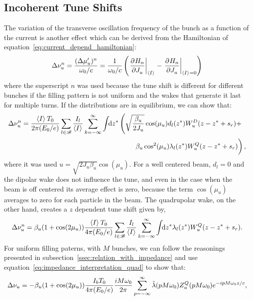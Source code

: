 \subsection{Incoherent Tune Shifts}\label{sec:incoherent_tune_shift}

    The variation of the transverse oscillation frequency of the bunch as a function of the current is another effect which can be derived from the Hamiltonian of equation~\eqref{eq:current_depend_hamiltonian}:
    \begin{align}
        \Delta\nu_u^n = \frac{(\Delta\mu'_u)^n}{\omega_0/c} = \frac{1}{\omega_0/c}\left(\left.\frac{\partial^{{}}H_n}{\partial J_u^{{}}}\right|_{\left\langle I \right\rangle_{{}}} - \left.\frac{\partial^{{}}H_n}{\partial J_u^{{}}}\right|_{\left\langle I \right\rangle_{{}}=0}\right)
    \end{align}
    where the superscript $n$ was used because the tune shift is different for different bunches if the filling pattern is not uniform and the wakes that generate it last for multiple turns. If the distributions are in equilibrium, we can show that:
    \begin{align}
        \Delta\nu_u^n = \frac{\average{I}T_0}{2\pi(E_0/e)}
        \sum_{l\in\mathscr{B}}\frac{I_l}{\average{I}}\sum_{k=-\infty}^\infty\udefint{z^*}{
        &\left(\sqrt{\frac{\beta_u}{2J_u}}\cos(\mu_u)d_l(z^*) W^D_u(z-z^* + s_r) +\right.\\
        &\left.\phantom{\sqrt{\frac{1_1}{1_1}}}\beta_u\cos^2(\mu_u)\lambda_l(z^*) W^Q_u(z-z^* + s_r)\right)},
    \end{align}
    where it was used $u = \sqrt{2J_u\beta_u}\cos(\mu_u)$. For a well centered beam, $d_l=0$ and the dipolar wake does not influence the tune, and even in the case when the beam is off centered its average effect is zero, because the term $\cos(\mu_u)$ averages to zero for each particle in the beam. The quadrupolar wake, on the other hand, creates a $z$ dependent tune shift given by,
    \begin{align}
        \Delta\nu_u^n = \beta_u(1+\cos(2\mu_u))\frac{\left\langle I \right\rangle_{{}}T_0}{4\pi(E_0/e)}
        \sum_{l\in\mathscr{B}}\frac{I_l}{\left\langle I \right\rangle_{{}}}\sum_{k=-\infty}^\infty\int\!\!\text{d}z^* 
        \lambda_l(z^*) W^Q_u(z-z^* + s_r).
    \end{align}
    For uniform filling paterns, with $M$ bunches, we can follow the reasonings presented in subsection~\ref{ssec:relation_with_impedance} and use equation~\eqref{eq:impedance_interpretation_quad} to show that:
    \begin{align}
        \Delta\nu_u = -\beta_u(1+\cos(2\mu_u))\frac{I_bT_0}{4\pi(E_0/e)}
        \frac{iM\omega_0}{2\pi} \sum_{p=-\infty}^\infty \tilde{\lambda}(pM\omega_0)Z^Q_u(pM\omega_0)e^{-ipM\omega_0 z/c},
    \end{align}
